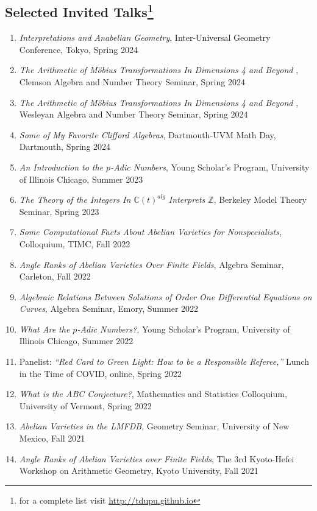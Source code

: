 \documentclass[a4paper,10pt]{article}
\begin{document}
\subsection*{Selected Invited Talks\footnote{ for a complete list visit \url{http://tdupu.github.io} }} 
\begin{enumerate} %
	\item \emph{Interpretations and Anabelian Geometry}, Inter-Universal Geometry Conference, Tokyo, Spring 2024
	\item \emph{The Arithmetic of M\"{o}bius Transformations In Dimensions 4 and Beyond }, Clemson Algebra and Number Theory Seminar, Spring 2024
	\item \emph{The Arithmetic of M\"{o}bius Transformations In Dimensions 4 and Beyond }, Wesleyan Algebra and Number Theory Seminar, Spring 2024
	\item \emph{Some of My Favorite Clifford Algebras}, Dartmouth-UVM Math Day, Dartmouth, Spring 2024 
	\item \emph{An Introduction to the $p$-Adic Numbers}, Young Scholar’s Program, University of Illinois Chicago, Summer 2023
	\item \emph{The Theory of the Integers In $\mathbb{C}(t)^{alg}$ Interprets $\mathbb{Z}$}, Berkeley Model Theory Seminar, Spring 2023
	\item \emph{Some Computational Facts About Abelian Varieties for Nonspecialists}, Colloquium, TIMC, Fall 2022
	\item \emph{Angle Ranks of Abelian Varieties Over Finite Fields}, Algebra Seminar, Carleton, Fall 2022
	\item \emph{Algebraic Relations Between Solutions of Order One Differential Equations on Curves}, Algebra Seminar, Emory, Summer 2022
	\item \emph{What Are the $p$-Adic Numbers?}, Young Scholar’s Program, University of Illinois Chicago, Summer 2022
	\item Panelist: \emph{“Red Card to Green Light: How to be a Responsible Referee,”} Lunch in the Time of COVID, online, Spring 2022
	\item \emph{What is the ABC Conjecture?}, Mathematics and Statistics Colloquium, University of Vermont, Spring 2022
	\item \emph{Abelian Varieties in the LMFDB}, Geometry Seminar, University of New Mexico, Fall 2021
	\item \emph{Angle Ranks of Abelian Varieties over Finite Fields}, The 3rd Kyoto-Hefei Workshop on Arithmetic Geometry, Kyoto University, Fall 2021

\end{enumerate}
\end{document}
